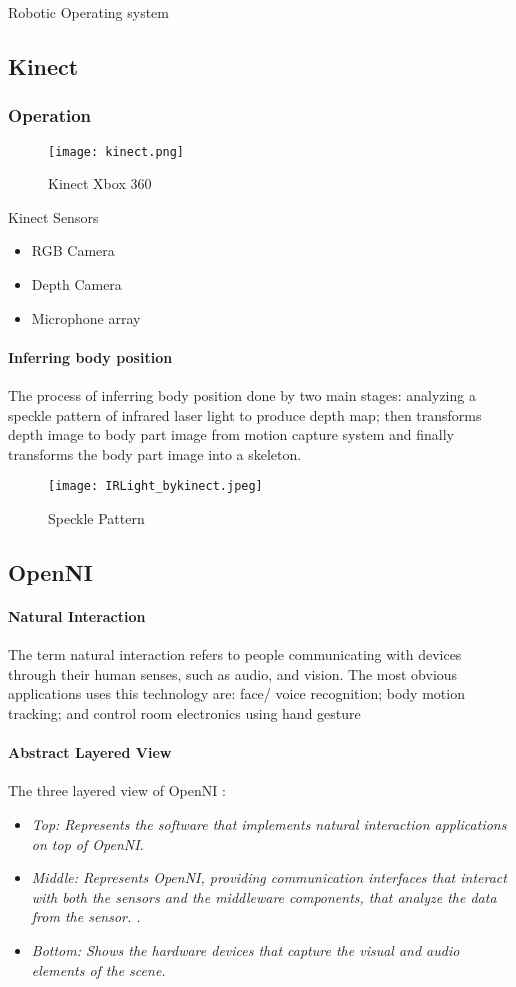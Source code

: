 \documentclass[a4paper]{book}
\begin{document}
\begin{chapter}{Robotic Operating system}
\subsection{Kinect}
\subsubsection{Operation}
\begin{figure}[h]
	\caption{Kinect Xbox 360}
	\centering
	\texttt{[image: kinect.png]}
\end{figure}
\large Kinect Sensors


\begin{itemize}
	\item RGB Camera
	\item Depth Camera
	\item Microphone array
\end{itemize}
\vspace{1cm}
\paragraph{Inferring body position}
The process of inferring body position done by two main stages: analyzing a speckle pattern of infrared laser light to produce depth map; then transforms depth image to
body part image from motion capture system and finally transforms the body part
image into a skeleton.
\begin{figure}[h]
	\centering
	\caption{Speckle Pattern}
	\texttt{[image: IRLight\_bykinect.jpeg]}
\end{figure}
 \newpage
 \subsection{OpenNI}
  \paragraph{ Natural Interaction}
 The term natural interaction refers to people communicating with devices through their human senses, such as audio, and vision. The most obvious applications uses this technology are: face/ voice recognition; body motion tracking; and control room electronics using hand gesture
 \paragraph{Abstract Layered View
 }
The three layered view of OpenNI :
\begin{itemize}
	\item \textit{Top: Represents the software that implements natural interaction applications on top of OpenNI.}
		\item \textit{Middle: Represents OpenNI, providing communication interfaces that interact with both the sensors and the middleware components, that analyze the data from the sensor.
			.}
			\item \textit{Bottom: Shows the hardware devices that capture the visual and audio elements of the scene.
			}
\end{itemize}


\end{chapter}
\end{document}
